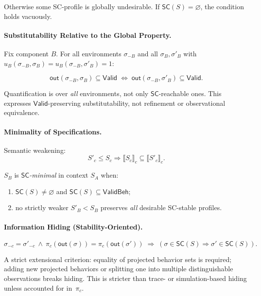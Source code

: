 Otherwise some SC-profile is globally undesirable.
If $\mathsf{SC}(S)=\varnothing$, the condition holds vacuously.

\paragraph{Substitutability Relative to the Global Property.}

Fix component $B$.
For all environments $\sigma_{-B}$ and all $\sigma_B,\sigma'_B$ with
$u_B(\sigma_{-B},\sigma_B)=u_B(\sigma_{-B},\sigma'_B)=1$:

\[
\mathsf{out}(\sigma_{-B},\sigma_B)\subseteq\mathsf{Valid}
\;\Longleftrightarrow\;
\mathsf{out}(\sigma_{-B},\sigma'_B)\subseteq\mathsf{Valid}.
\]

Quantification is over \emph{all} environments, not only $\mathsf{SC}$-reachable ones.
This expresses $\mathsf{Valid}$-preserving substitutability, not refinement or observational equivalence.

\paragraph{Minimality of Specifications.}

Semantic weakening:
\[
S'_c \le S_c \Rightarrow 
\llbracket S_c\rrbracket_c \subseteq \llbracket S'_c\rrbracket_c.
\]

$S_B$ is \emph{$\mathsf{SC}$-minimal} in context $S_A$ when:
\begin{enumerate}
\item $\mathsf{SC}(S)\neq\varnothing$ and $\mathsf{SC}(S)\subseteq\mathsf{ValidBeh}$;
\item no strictly weaker $S'_B < S_B$ preserves \emph{all} desirable SC-stable profiles.
\end{enumerate}

\paragraph{Information Hiding (Stability-Oriented).}

\[
\sigma_{-c}=\sigma'_{-c}
\ \land\
\pi_c(\mathsf{out}(\sigma))=\pi_c(\mathsf{out}(\sigma'))
\;\Rightarrow\;
(\sigma\in\mathsf{SC}(S)\Rightarrow \sigma'\in\mathsf{SC}(S)).
\]

A strict extensional criterion:
equality of projected behavior sets is required; adding new projected behaviors or splitting one into multiple distinguishable observations breaks hiding.
This is stricter than trace- or simulation-based hiding unless accounted for in~$\pi_c$.
